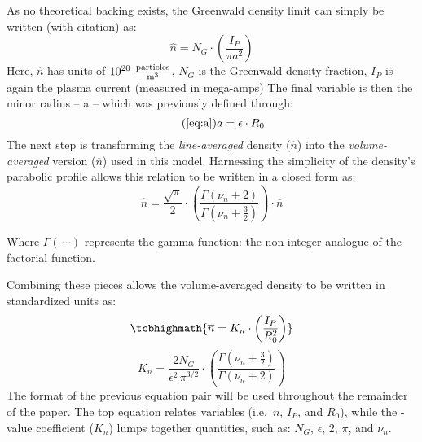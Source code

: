 As no theoretical backing exists, the Greenwald density limit can simply be written (with citation) as: \cite{greenwald}
\begin{equation}
	\hat n = N_G \cdot \left( \frac{ I_P }{ \pi a^2} \right)
\end{equation}
Here, $\hat n$ has units of $10^{20} \ \frac{\textnormal{particles}}{\textnormal{m}^3}$, $N_G$ is the Greenwald density fraction,  $I_P$ is again the plasma current (measured in mega-amps)  The final variable is then the minor radius -- a -- which was previously defined through:
\begin{equation}
	\tag{\ref{eq:a}}
	a = \epsilon \cdot R_0
\end{equation}
The next step is transforming the \emph{line-averaged} density ($\hat n$) into the \emph{volume-averaged} version ($\overline n$) used in this model. Harnessing the simplicity of the density's parabolic profile allows this relation to be written in a closed form as:
 \begin{equation}
 	\hat n = \frac{\sqrt{\pi}}{2} \cdot \left( \frac{\Gamma \left( \nu_n + 2 \right)}{\Gamma \left( \nu_n + \frac{3}{2} \right)} \right) \cdot \overline n 
 \end{equation}
 
 Where $\Gamma( \, \cdots)$ represents the gamma function: the non-integer analogue of the factorial function.
 
 Combining these pieces allows the volume-averaged density to be written in standardized units  as:
 \begin{equation}
 	\label{eq:greenwald}
 	\tcbhighmath{
 	\overline n = K_n \cdot \left( \frac{I_P}{R_0^2} \right)
 	}
 	 \myequations{Greenwald Density -- $\overline n$}
 \end{equation}
 \begin{equation}
 	K_n = \frac{2 N_G}{\epsilon^2 \, \pi^{3/2} } \cdot \left( \frac{\Gamma \left( \nu_n + \frac{3}{2} \right)}{\Gamma \left( \nu_n + 2 \right)} \right)
\end{equation}
The format of the previous equation pair will be used throughout the remainder of the paper. The top equation relates  variables (i.e.\ $\overline n$, $I_P$, and $R_0$), while the -value coefficient ($K_n$) lumps together  quantities, such as: $N_G$, $\epsilon$, 2, $\pi$, and $\nu_n$.

